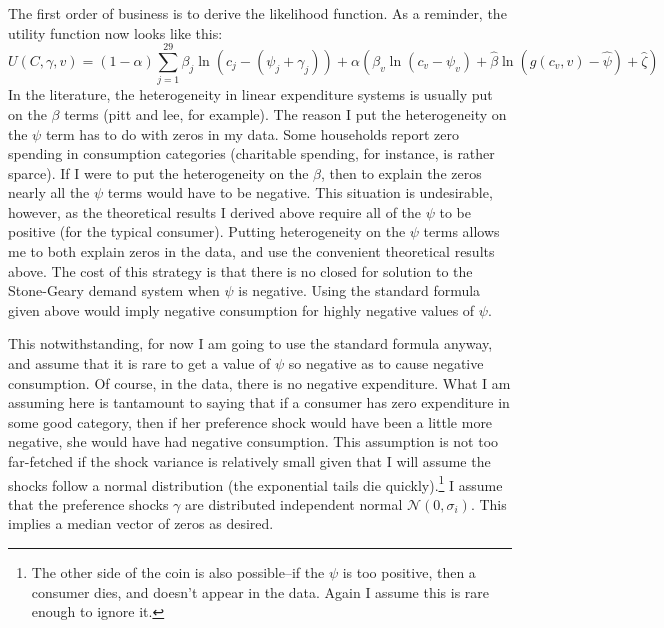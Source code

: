 \documentclass{article}
\begin{document}
The first order of business is to derive the likelihood function.
As a reminder, the utility function now looks like this:
\begin{equation}
	\label{totuti}
U(C,\gamma,v) = (1-\alpha) \sum_{j=1}^{29}\beta_j \ln(c_j - (\psi_j+\gamma_j))  + \alpha \left(\beta_v \ln(c_v - \psi_v)+ \hat{\beta}\ln(g(c_v,v) - \hat{\psi}) + \hat{\zeta} \right)
\end{equation}
In the literature, the heterogeneity in linear expenditure systems is usually put on the $\beta$ terms (pitt and lee, for example).
The reason I put the heterogeneity on the $\psi$ term has to do with zeros in my data.
Some households report zero spending in consumption categories (charitable spending, for instance, is rather sparce).
If I were to put the heterogeneity on the $\beta$, then to explain the zeros nearly all the $\psi$ terms would have to be negative.
This situation is undesirable, however, as the theoretical results I derived above require all of the $\psi$ to be positive (for the typical consumer).
Putting heterogeneity on the $\psi$ terms allows me to both explain zeros in the data, and use the convenient theoretical results above.
The cost of this strategy is that there is no closed for solution to the Stone-Geary demand system when $\psi$ is negative.
 Using the standard formula given above would imply negative consumption for highly negative values of $\psi$.

 This notwithstanding, for now I am going to use the standard formula anyway, and assume that it is rare to get a value of $\psi$ so negative as to cause negative consumption.
 Of course, in the data, there is no negative expenditure.
 What I am assuming here is tantamount to saying that if a consumer has zero expenditure in some good category, then if her preference shock would have been a little more negative, she would have had negative consumption.
 This assumption is not too far-fetched if the shock variance is relatively small given that I will assume the shocks follow a normal distribution (the exponential tails die quickly).\footnote{The other side of the coin is also possible--if the $\psi$ is too positive, then a consumer dies, and doesn't appear in the data.  Again I assume this is rare enough to ignore it.}
I assume that the preference shocks $\gamma$ are distributed independent normal $\mathcal{N}(0,\sigma_i)$.
This implies a median vector of zeros as desired.
\end{document}

